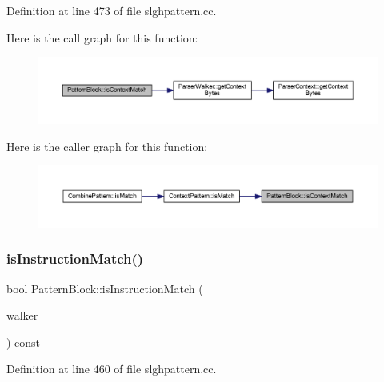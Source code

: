 Definition at line 473 of file slghpattern.\+cc.

Here is the call graph for this function\+:
\nopagebreak
\begin{figure}[H]
\begin{center}
\leavevmode
\includegraphics[width=350pt]{class_pattern_block_a3ea9defadd1e8f6a1e5744883ed9859e_cgraph}
\end{center}
\end{figure}
Here is the caller graph for this function\+:
\nopagebreak
\begin{figure}[H]
\begin{center}
\leavevmode
\includegraphics[width=350pt]{class_pattern_block_a3ea9defadd1e8f6a1e5744883ed9859e_icgraph}
\end{center}
\end{figure}
\mbox{\label{class_pattern_block_a64c44360ffff4e4b508d5b1ac0f7b9a2}} 
\subsubsection{\texorpdfstring{isInstructionMatch()}{isInstructionMatch()}}
{\footnotesize\ttfamily bool Pattern\+Block\+::is\+Instruction\+Match (\begin{DoxyParamCaption}\item[{\mbox{\hyperlink{class_parser_walker}{Parser\+Walker}} \&}]{walker }\end{DoxyParamCaption}) const}



Definition at line 460 of file slghpattern.\+cc.

